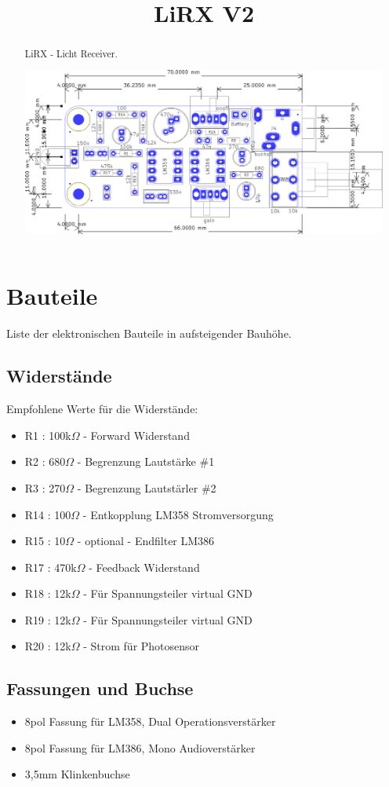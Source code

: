 \documentclass[]{article}
\title{LiRX V2}
\author{}
\date{}
\begin{document}
\maketitle

\begin{abstract}
	LiRX - Licht Receiver.
	
		
	
	\includegraphics[width=1.0\linewidth]{Platine.png}

\end{abstract}

\section{Bauteile}
Liste der elektronischen Bauteile in aufsteigender Bauhöhe.
\subsection{Widerstände}
Empfohlene Werte für die Widerstände:
\begin{itemize}
	\item R1 :	100k$\Omega$ - Forward Widerstand 
	\item R2 :  680$\Omega$ - Begrenzung Lautstärke \#1
	\item R3 : 	270$\Omega$ - Begrenzung Lautstärler \#2
	\item R14 : 100$\Omega$ - Entkopplung LM358 Stromversorgung
	\item R15 : 10$\Omega$ - optional - Endfilter LM386
	\item R17 : 470k$\Omega$ - Feedback Widerstand
	\item R18 : 12k$\Omega$ - Für Spannungsteiler virtual GND 
	\item R19 : 12k$\Omega$ - Für Spannungsteiler virtual GND
	\item R20 : 12k$\Omega$ - Strom für Photosensor
\end{itemize}
\subsection{Fassungen und Buchse}
\begin{itemize}
	\item 8pol Fassung für LM358, Dual Operationsverstärker
	\item 8pol Fassung für LM386, Mono Audioverstärker
	\item 3,5mm Klinkenbuchse
\end{itemize}
\end{document}
